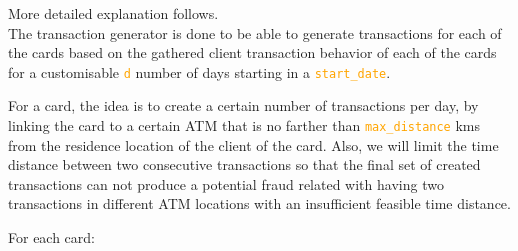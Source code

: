 \documentclass{article}
\begin{document}
More detailed explanation follows.
\\


The transaction generator is done to be able to generate transactions for 
each of the cards based on the gathered client transaction behavior of each of the cards 
for a customisable \textcolor{orange}{\texttt{d}} number of days starting in a 
\textcolor{orange}{\texttt{start\_date}}. 

For a card, the idea is to create a certain 
number of transactions per day, by linking the card to a certain ATM that is no farther 
than \textcolor{orange}{\texttt{max\_distance}} kms from the residence location of the 
client of the card. Also, we will limit the time distance between two consecutive 
transactions so that the final set of created transactions can not produce a potential 
fraud related with having two transactions in different ATM locations with an insufficient 
feasible time distance.

For each card:  
\end{document}
